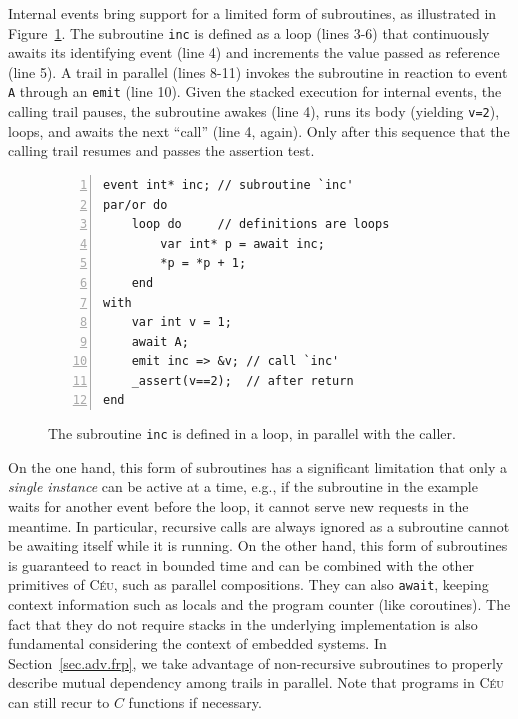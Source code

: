 \documentclass{acm_proc_article-sp}
\newcommand{\CEU}{\textsc{C\'{e}u}\xspace}
\newcommand{\code}[1] {{\small{\texttt{#1}}}}
\newcommand{\1}{\;}
\newcommand{\2}{\;\;}
\newcommand{\3}{\;\;\;}
\newcommand{\5}{\;\;\;\;\;}
\begin{document}
Internal events bring support for a limited form of subroutines, as illustrated 
in Figure~\ref{lst.sub}.
The subroutine \code{inc} is defined as a loop (lines 3-6) that continuously 
awaits its identifying event (line 4) and increments the value passed as 
reference (line 5).
A trail in parallel (lines 8-11) invokes the subroutine in reaction to event 
\code{A} through an \code{emit} (line 10).
Given the stacked execution for internal events, the calling trail pauses, the 
subroutine awakes (line 4), runs its body (yielding \code{v=2}), loops, and 
awaits the next ``call'' (line 4, again).
Only after this sequence that the calling trail resumes and passes the 
assertion test.
 
\begin{figure}
\begin{lstlisting}[numbers=left,xleftmargin=2em]
event int* inc; // subroutine `inc'
par/or do
    loop do     // definitions are loops
        var int* p = await inc;
        *p = *p + 1;
    end
with
    var int v = 1;
    await A;
    emit inc => &v; // call `inc'
    _assert(v==2);  // after return
end
\end{lstlisting}
\caption{ The subroutine \code{inc} is defined in a loop, in parallel with the 
caller.
\label{lst.sub}
}
\end{figure}

On the one hand, this form of subroutines has a significant limitation that 
only a \emph{single instance} can be active at a time, e.g., if the subroutine 
in the example waits for another event before the loop, it cannot serve new 
requests in the meantime.
In particular, recursive calls are always ignored as a subroutine cannot be 
awaiting itself while it is running.
%
On the other hand, this form of subroutines is guaranteed to react in bounded 
time and can be combined with the other primitives of \CEU, such as parallel 
compositions.
They can also \code{await}, keeping context information such as locals and the 
program counter (like coroutines).
%
The fact that they do not require stacks in the underlying implementation is 
also fundamental considering the context of embedded systems.
%
In Section~\ref{sec.adv.frp}, we take advantage of non-recursive subroutines to 
properly describe mutual dependency among trails in parallel.
Note that programs in \CEU can still recur to $C$ functions if necessary.
\end{document}
